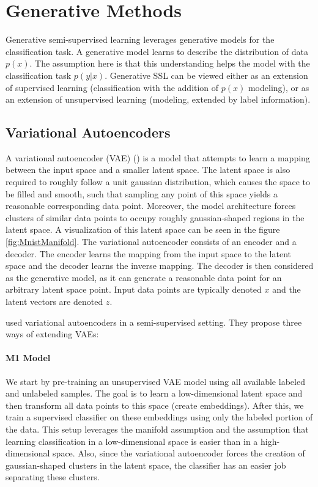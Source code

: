 \section{Generative Methods}
\label{sec:GenerativeSslMethods}

Generative semi-supervised learning leverages generative models for the classification task. A generative model learns to describe the distribution of data $p(x)$. The assumption here is that this understanding helps the model with the classification task $p(y|x)$. Generative SSL can be viewed either as an extension of supervised learning (classification with the addition of $p(x)$ modeling), or as an extension of unsupervised learning (modeling, extended by label information).


\subsection{Variational Autoencoders}

A variational autoencoder (VAE) (\cite{VariationalAutoencoder}) is a model that attempts to learn a mapping between the input space and a smaller latent space. The latent space is also required to roughly follow a unit gaussian distribution, which causes the space to be filled and smooth, such that sampling any point of this space yields a reasonable corresponding data point. Moreover, the model architecture forces clusters of similar data points to occupy roughly gaussian-shaped regions in the latent space. A visualization of this latent space can be seen in the figure \ref{fig:MnistManifold}. The variational autoencoder consists of an encoder and a decoder. The encoder learns the mapping from the input space to the latent space and the decoder learns the inverse mapping. The decoder is then considered as the generative model, as it can generate a reasonable data point for an arbitrary latent space point. Input data points are typically denoted $x$ and the latent vectors are denoted $z$.

\cite{KingmaSslVae} used variational autoencoders in a semi-supervised setting. They propose three ways of extending VAEs:

\paragraph*{M1 Model}
We start by pre-training an unsupervised VAE model using all available labeled and unlabeled samples. The goal is to learn a low-dimensional latent space and then transform all data points to this space (create embeddings). After this, we train a supervised classifier on these embeddings using only the labeled portion of the data. This setup leverages the manifold assumption and the assumption that learning classification in a low-dimensional space is easier than in a high-dimensional space. Also, since the variational autoencoder forces the creation of gaussian-shaped clusters in the latent space, the classifier has an easier job separating these clusters.

